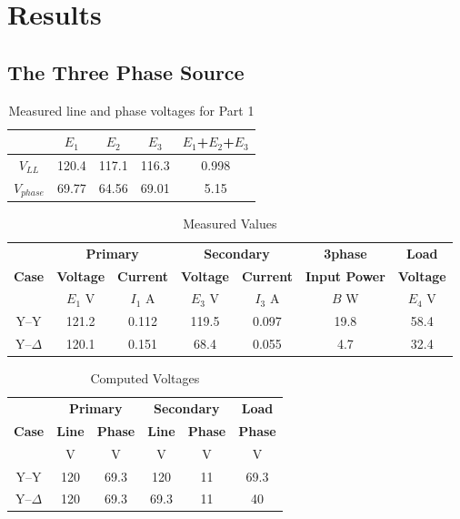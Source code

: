 \documentclass{article}
\begin{document}
\section{Results}
\subsection{The Three Phase Source}
\begin{table}[H]
  \centering
  \begin{tabular}{*{5}{c}}
    & \textbf{$E_1$} & \textbf{$E_2$} & \textbf{$E_3$} & \textbf{$E_1$+$E_2$+$E_3$} \\

    \hline

    \textbf{$V_{LL}$} & 120.4 & 117.1 & 116.3 & 0.998 \\
    \textbf{$V_{phase}$} & 69.77 & 64.56 & 69.01 & 5.15 \\
  \end{tabular}
  \caption{Measured line and phase voltages for Part 1}
  \label{tab:3phase_source}
\end{table}

\begin{table}[H]
  \centering
  \begin{tabular}{*{7}{c}}
    & \multicolumn{2}{c}{\textbf{Primary}} &
    \multicolumn{2}{c}{\textbf{Secondary}} & \textbf{3phase} & \textbf{Load} \\

    \textbf{Case} & \textbf{Voltage} & \textbf{Current} & \textbf{Voltage} &
    \textbf{Current} & \textbf{Input Power} & \textbf{Voltage} \\

    & $E_1$ V & $I_1$ A & $E_3$ V & $I_3$ A & $B$ W & $E_4$ V \\

    \hline
    Y--Y        & 121.2 & 0.112 & 119.5 & 0.097 & 19.8 & 58.4 \\
    Y--$\Delta$ & 120.1 & 0.151 & 68.4 & 0.055 & 4.7 & 32.4 \\
  \end{tabular}
  \caption{Measured Values}
  \label{tab:results}
\end{table}

\begin{table}[H]
  \centering
  \begin{tabular}{*{6}{c}}

    & \multicolumn{2}{c}{\textbf{Primary}}
    & \multicolumn{2}{c}{\textbf{Secondary}} & \textbf{Load} \\

    \textbf{Case} & \textbf{Line} & \textbf{Phase} & \textbf{Line} &
    \textbf{Phase} & \textbf{Phase} \\

    & V & V & V & V & V \\
    \hline

    Y--Y        & 120 & 69.3 & 120 & 11 & 69.3 \\
    Y--$\Delta$ & 120 & 69.3 & 69.3 & 11 & 40 \\
  \end{tabular}
  \caption{Computed Voltages}
  \label{tab:volt_comp}
\end{table}
\end{document}
